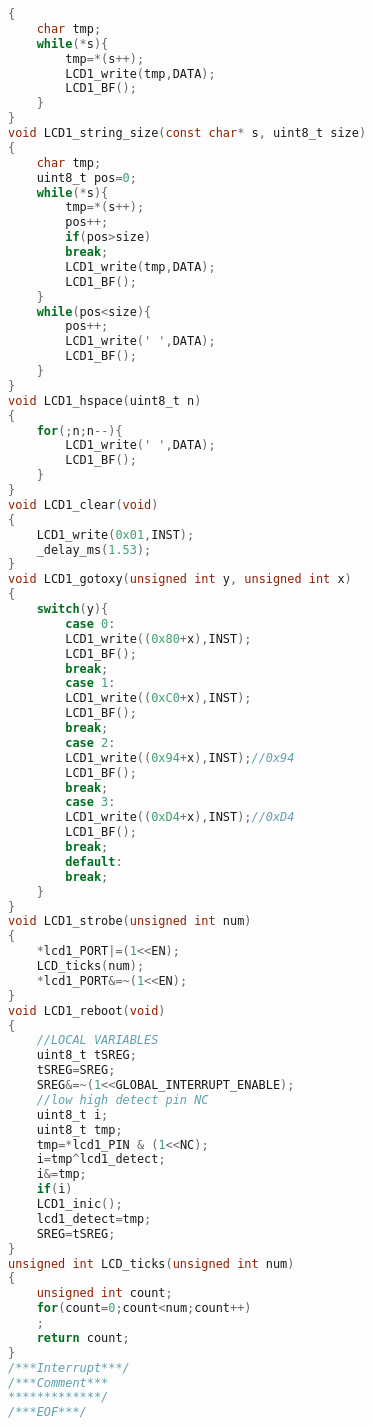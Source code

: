 \begin{lstlisting}[language=C, caption={lcd.c}, label=lcd-c, captionpos=b]
{
	char tmp;
	while(*s){
		tmp=*(s++);
		LCD1_write(tmp,DATA);
		LCD1_BF();
	}
}
void LCD1_string_size(const char* s, uint8_t size)
{
	char tmp;
	uint8_t pos=0;
	while(*s){
		tmp=*(s++);
		pos++;
		if(pos>size)
		break;
		LCD1_write(tmp,DATA);
		LCD1_BF();
	}
	while(pos<size){
		pos++;
		LCD1_write(' ',DATA);
		LCD1_BF();
	}
}
void LCD1_hspace(uint8_t n)
{
	for(;n;n--){
		LCD1_write(' ',DATA);
		LCD1_BF();
	}
}
void LCD1_clear(void)
{
	LCD1_write(0x01,INST);
	_delay_ms(1.53);
}
void LCD1_gotoxy(unsigned int y, unsigned int x)
{
	switch(y){
		case 0:
		LCD1_write((0x80+x),INST);
		LCD1_BF();
		break;
		case 1:
		LCD1_write((0xC0+x),INST);
		LCD1_BF();
		break;
		case 2:
		LCD1_write((0x94+x),INST);//0x94
		LCD1_BF();
		break;
		case 3:
		LCD1_write((0xD4+x),INST);//0xD4
		LCD1_BF();
		break;
		default:
		break;
	}
}
void LCD1_strobe(unsigned int num)
{
	*lcd1_PORT|=(1<<EN);
	LCD_ticks(num);
	*lcd1_PORT&=~(1<<EN);
}
void LCD1_reboot(void)
{
	//LOCAL VARIABLES
	uint8_t tSREG;
	tSREG=SREG;
	SREG&=~(1<<GLOBAL_INTERRUPT_ENABLE);
	//low high detect pin NC
	uint8_t i;
	uint8_t tmp;
	tmp=*lcd1_PIN & (1<<NC);
	i=tmp^lcd1_detect;
	i&=tmp;
	if(i)
	LCD1_inic();
	lcd1_detect=tmp;
	SREG=tSREG;
}
unsigned int LCD_ticks(unsigned int num)
{
	unsigned int count;
	for(count=0;count<num;count++)
	;
	return count;
}
/***Interrupt***/
/***Comment***
*************/
/***EOF***/
\end{lstlisting}
